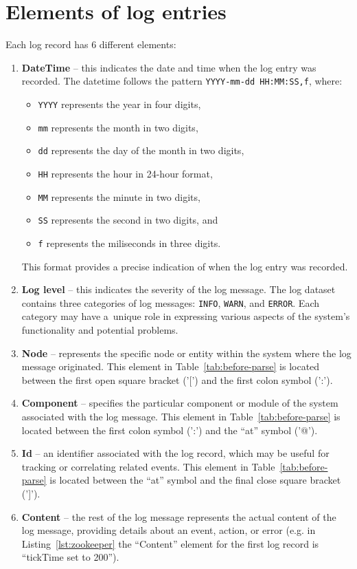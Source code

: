 \section{Elements of log entries}
Each log record has 6 different elements:
\begin{enumerate}
    \item \textbf{DateTime} \--- this indicates the date and time when the log entry was recorded. The datetime follows the pattern \texttt{YYYY-mm-dd HH:MM:SS,f}, where:
    \begin{itemize}
        \item \texttt{YYYY} represents the year in four digits,
        \item \texttt{mm} represents the month in two digits,
        \item \texttt{dd} represents the day of the month in two digits,
        \item \texttt{HH} represents the hour in 24-hour format,
        \item \texttt{MM} represents the minute in two digits,
        \item \texttt{SS} represents the second in two digits, and
        \item \texttt{f} represents the miliseconds in three digits.
    \end{itemize}
    This format provides a precise indication of when the log entry was recorded.
    
    \item \textbf{Log level} \--- this indicates the severity of the log message. The log dataset contains three categories of log messages: \texttt{INFO}, \texttt{WARN}, and \texttt{ERROR}. Each category may have a~unique role in expressing various aspects of the system's functionality and potential problems.
    
    \item \textbf{Node} \--- represents the specific node or entity within the system where the log message originated. This element in Table~\ref{tab:before-parse} is located between the first open square bracket ('[') and the first colon symbol (':').

    \item \textbf{Component} \--- specifies the particular component or module of the system associated with the log message. This element in Table~\ref{tab:before-parse} is located between the first colon symbol (':') and the ``at'' symbol ('@').

    \item \textbf{Id} \--- an identifier associated with the log record, which may be useful for tracking or correlating related events. This element in Table~\ref{tab:before-parse} is located between the ``at'' symbol and the final close square bracket (']').

    \item \textbf{Content} \--- the rest of the log message represents the actual content of the log message, providing details about an event, action, or error (e.g. in Listing~\ref{lst:zookeeper} the ``Content'' element for the first log record is ``tickTime set to 200'').
\end{enumerate}

